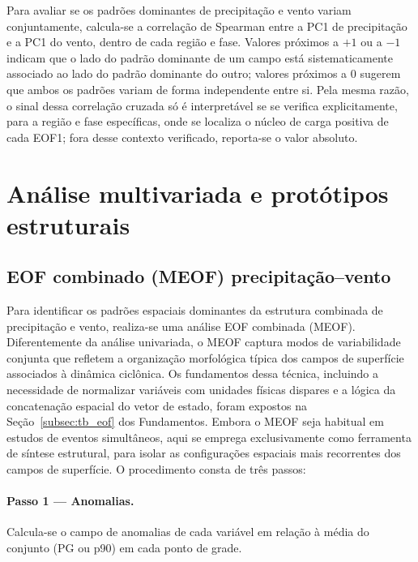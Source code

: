 Para avaliar se os padrões dominantes de precipitação e vento variam conjuntamente, calcula-se a correlação de Spearman entre a PC1 de precipitação e a PC1 do vento, dentro de cada região e fase.
Valores próximos a $+1$ ou a $-1$ indicam que o lado do padrão dominante de um campo está sistematicamente associado ao lado do padrão dominante do outro; valores próximos a $0$ sugerem que ambos os padrões variam de forma independente entre si.
Pela mesma razão, o sinal dessa correlação cruzada só é interpretável se se verifica explicitamente, para a região e fase específicas, onde se localiza o núcleo de carga positiva de cada EOF1; fora desse contexto verificado, reporta-se o valor absoluto.


\section{Análise multivariada e protótipos estruturais}\label{sec:meof_prototipos}

\subsection{EOF combinado (MEOF) precipitação--vento}\label{subsec:eof_multivariado}

Para identificar os padrões espaciais dominantes da estrutura combinada de precipitação e vento, realiza-se uma análise EOF combinada (MEOF). Diferentemente da análise univariada, o MEOF captura modos de variabilidade conjunta que refletem a organização morfológica típica dos campos de superfície associados à dinâmica ciclônica. Os fundamentos dessa técnica, incluindo a necessidade de normalizar variáveis com unidades físicas dispares e a lógica da concatenação espacial do vetor de estado, foram expostos na Seção~\ref{subsec:tb_eof} dos Fundamentos. Embora o MEOF seja habitual em estudos de eventos simultâneos, aqui se emprega exclusivamente como ferramenta de síntese estrutural, para isolar as configurações espaciais mais recorrentes dos campos de superfície. O procedimento consta de três passos:

\paragraph{Passo 1 — Anomalias.} Calcula-se o campo de anomalias de cada variável em relação à média do conjunto (PG ou p90) em cada ponto de grade.

